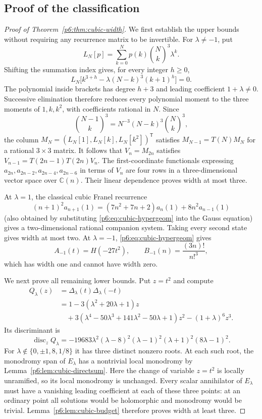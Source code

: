 \documentclass[11pt,a4paper]{article}
\theoremstyle{definition}
\theoremstyle{remark}
\numberwithin{equation}{section}
\begin{document}
\subsection{Proof of the classification}

\begin{proof}[Proof of Theorem~\ref{p6:thm:cubic-width}]
We first establish the upper bounds without requiring any recurrence
matrix to be invertible. For $\lambda\ne-1$, put
\[
 L_N[p]=\sum_{k=0}^Np(k)\binom Nk^3\lambda^k.
\]
Shifting the summation index gives, for every integer $h\geq0$,
\[
 L_N\bigl[k^{3+h}-\lambda(N-k)^3(k+1)^h\bigr]=0.
\]
The polynomial inside brackets has degree $h+3$ and leading
coefficient $1+\lambda\ne0$. Successive elimination therefore reduces
every polynomial moment to the three moments of $1,k,k^2$, with
coefficients rational in $N$. Since
\[
 \binom{N-1}{k}^3=N^{-3}(N-k)^3\binom Nk^3,
\]
the column $M_N=(L_N[1],L_N[k],L_N[k^2])^{\mathsf T}$ satisfies
$M_{N-1}=T(N)M_N$ for a rational $3\times3$ matrix.
It follows that $V_n=M_{2n}$ satisfies
$V_{n-1}=T(2n-1)T(2n)V_n$. The first-coordinate functionals expressing
$a_{2n},a_{2n-2},a_{2n-4},a_{2n-6}$ in terms of $V_n$ are four rows in
a three-dimensional vector space over $\mathbb C(n)$. Their linear
dependence proves width at most three.

At $\lambda=1$, the classical cubic Franel recurrence
\[
 (n+1)^2a_{n+1}(1)=(7n^2+7n+2)a_n(1)+8n^2a_{n-1}(1)
\]
(also obtained by substituting \eqref{p6:eq:cubic-hypergeom} into the
Gauss equation) gives a two-dimensional rational companion system.
Taking every second state gives width at most two.
At $\lambda=-1$, \eqref{p6:eq:cubic-hypergeom} gives
\[
 A_{-1}(t)=H(-27t^2),\qquad
 B_{-1}(n)=\frac{(3n)!}{n!^3},
\]
which has width one and cannot have width zero.

We next prove all remaining lower bounds. Put $z=t^2$ and compute
\begin{align*}
 Q_\lambda(z)&=\Delta_\lambda(t)\Delta_\lambda(-t)\\
 &=1-3(\lambda^2+20\lambda+1)z\\
 &\quad+3(\lambda^4-50\lambda^3+141\lambda^2-50\lambda+1)z^2
       -(1+\lambda)^6z^3.
\end{align*}
Its discriminant is
\[
 \operatorname{disc}_z Q_\lambda
 =-19683\lambda^2(\lambda-8)^2(\lambda-1)^2
                   (\lambda+1)^2(8\lambda-1)^2.
\]
For $\lambda\notin\{0,\pm1,8,1/8\}$ it has three distinct nonzero
roots. At each such root, the monodromy span of $E_\lambda$ has a
nontrivial local monodromy by Lemma~\ref{p6:lem:cubic-directsum}.
Here the change of variable $z=t^2$ is locally unramified, so its
local monodromy is unchanged. Every scalar annihilator of
$E_\lambda$ must have a vanishing leading coefficient at each of
these three points: at an ordinary point all solutions would be
holomorphic and monodromy would be trivial. Lemma~\ref{p6:lem:cubic-budget}
therefore proves width at least three.


\end{proof}
\end{document}
